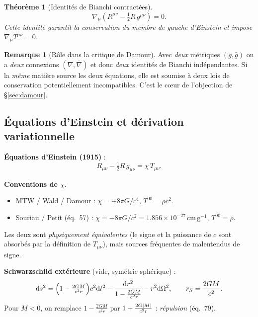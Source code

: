 \documentclass[11pt,a4paper]{article}
\theoremstyle{definition}
\newtheorem{remarque}{Remarque}[section]
\theoremstyle{plain}
\newtheorem{theoreme}{Théorème}[section]
\newcommand{\gbar}{\bar{g}}
\newcommand{\nablabar}{\bar{\nabla}}
\newcommand{\half}{\tfrac{1}{2}}
\newcommand{\eqpaper}[1]{\textsf{(éq.~#1)}}   %
\begin{document}
\begin{theoreme}[Identités de Bianchi contractées]
\label{th:bianchi}
\begin{equation}
\nabla_\mu\!\left(R^{\mu\nu}-\half R\,g^{\mu\nu}\right)=0.
\label{eq:bianchi}
\end{equation}
Cette identité garantit la conservation du membre de gauche d'Einstein et impose
$\nabla_\mu T^{\mu\nu}=0$.
\end{theoreme}

\begin{remarque}[Rôle dans la critique de Damour]
Avec \emph{deux} métriques $(g,\gbar)$ on a \emph{deux} connexions $(\nabla,\nablabar)$ et donc
\emph{deux} identités de Bianchi indépendantes. Si la \emph{même} matière source les deux
équations, elle est soumise à deux lois de conservation potentiellement incompatibles.
C'est le cœur de l'objection de \S\ref{sec:damour}.
\end{remarque}

\subsection{Équations d'Einstein et dérivation variationnelle}
\label{sec:einstein}

\textbf{Équations d'Einstein (1915)} :
\begin{equation}
R_{\mu\nu}-\half R\,g_{\mu\nu}=\chi\,T_{\mu\nu}.
\label{eq:einstein}
\end{equation}

\textbf{Conventions de $\chi$.}
\begin{itemize}[leftmargin=1.4em,nosep]
\item MTW / Wald / Damour : $\chi=+8\pi G/c^4$, $T^{00}=\rho c^2$.
\item Souriau / Petit \eqpaper{57} : $\chi=-8\pi G/c^2=1.856\times10^{-27}\,\mathrm{cm\,g^{-1}}$,
$T^{00}=\rho$.
\end{itemize}
Les deux sont \emph{physiquement équivalentes} (le signe et la puissance de $c$ sont absorbés
par la définition de $T_{\mu\nu}$), mais sources fréquentes de malentendus de signe.

\textbf{Schwarzschild extérieure} (vide, symétrie sphérique) :
\begin{equation}
\dd s^2=\Bigl(1-\tfrac{2GM}{c^2r}\Bigr)c^2\dd t^2
-\frac{\dd r^2}{1-\tfrac{2GM}{c^2r}}-r^2\dd\Omega^2,
\qquad r_S=\frac{2GM}{c^2}.
\label{eq:schwext}
\end{equation}
Pour $M<0$, on remplace $1-\tfrac{2GM}{c^2r}$ par $1+\tfrac{2G\abs{M}}{c^2r}$ : \emph{répulsion}
\eqpaper{79}.
\end{document}
